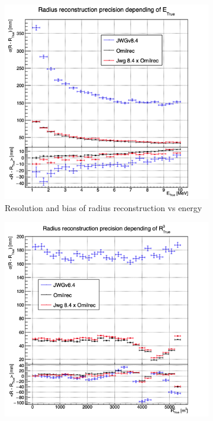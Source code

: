 \documentclass[../main.tex]{subfiles}
\begin{document}
\begin{figure}[ht]
  \begin{subfigure}[t]{0.48\linewidth}
    \centering
    \includegraphics[width=\linewidth]{images/jgnn/MESBvET.png}
    \caption{Resolution and bias of radius reconstruction vs energy}
    \label{fig:jgnn:MSBvETC}
  \end{subfigure}
  \begin{subfigure}[t]{0.48\linewidth}
    \centering
    \includegraphics[width=\linewidth]{images/jgnn/MSBvRT.png}

\end{subfigure}
\end{figure}
\end{document}
